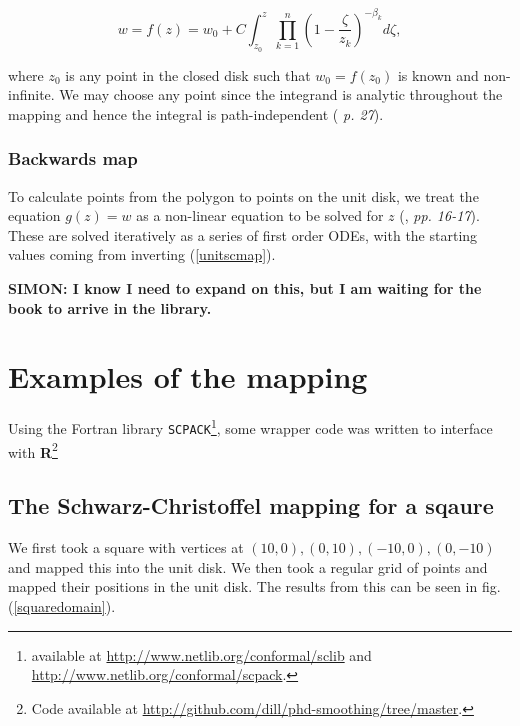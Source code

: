 \documentclass[a4paper,10pt]{amsart}
\newcommand{\sch}{Schwarz-Christoffel }
\begin{document}
\begin{equation}
\label{unitscmap}
w=f(z) = w_0 + C \int_{z_0}^{z} \prod_{k=1}^{n} (1 - \frac{\zeta}{z_k})^{-\beta_k} d\zeta,
\end{equation}

where $z_0$ is any point in the closed disk such that $w_0 = f(z_0)$ is known and non-infinite. We may choose any point since the integrand is analytic throughout the mapping and hence the integral is path-independent (\cite{driscoll} \emph{p. 27}).


\subsubsection{Backwards map}

To calculate points from the polygon to points on the unit disk, we treat the equation $g(z)=w$ as a non-linear equation to be solved for $z$ (\cite{trefethen}, \emph{pp. 16-17}). These are solved iteratively as a series of first order ODEs, with the starting values coming from inverting (\ref{unitscmap}).

\textbf{SIMON: I know I need to expand on this, but I am waiting for the book to arrive in the library.}

\section{Examples of the mapping}

Using the Fortran library \texttt{SCPACK}\footnote{available at \url{http://www.netlib.org/conformal/sclib} and \url{http://www.netlib.org/conformal/scpack}.}, some wrapper code was written to interface with \textbf{R}\footnote{Code available at \url{http://github.com/dill/phd-smoothing/tree/master}.}

\subsection{The \sch mapping for a sqaure}
We first took a square with vertices at $(10,0), (0,10),(-10,0),(0,-10)$ and mapped this into the unit disk. We then took a regular grid of points and mapped their positions in the unit disk. The results from this can be seen in fig. (\ref{squaredomain}).
\end{document}
